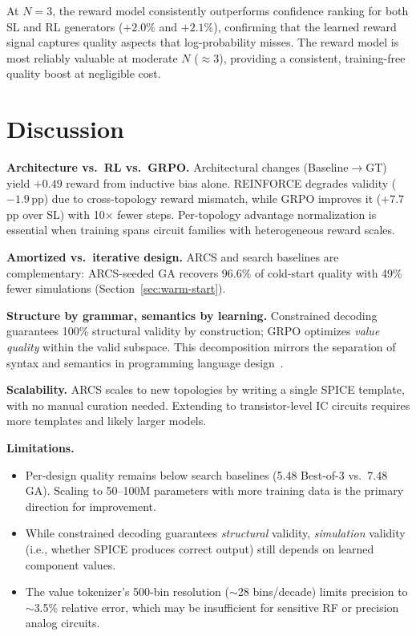 \documentclass[conference]{IEEEtran}
\begin{document}
At $N\!=\!3$, the reward model consistently outperforms confidence
ranking for both SL and RL generators ($+2.0\%$ and $+2.1\%$),
confirming that the learned reward signal captures quality aspects
that log-probability misses. The reward model is most reliably
valuable at moderate $N$ ($\approx$3), providing a consistent,
training-free quality boost at negligible cost.

\section{Discussion}
\label{sec:discussion}

\textbf{Architecture vs.\ RL vs.\ GRPO.} Architectural changes
(Baseline$\to$GT) yield $+0.49$ reward from inductive
bias alone. REINFORCE degrades validity ($-1.9$\,pp) due to
cross-topology reward mismatch, while GRPO improves it ($+7.7$\,pp
over SL) with 10$\times$ fewer steps. Per-topology advantage
normalization is essential when training spans circuit families with
heterogeneous reward scales.

\textbf{Amortized vs.\ iterative design.} ARCS and search baselines
are complementary: ARCS-seeded GA recovers 96.6\% of cold-start
quality with 49\% fewer simulations (Section~\ref{sec:warm-start}).

\textbf{Structure by grammar, semantics by learning.}
Constrained decoding guarantees 100\% structural validity by
construction; GRPO optimizes \emph{value quality} within the valid
subspace. This decomposition mirrors the separation of syntax and
semantics in programming language design~\cite{hokamp2017lexically}.

\textbf{Scalability.} ARCS scales to new topologies by writing a
single SPICE template, with no manual curation needed. Extending to
transistor-level IC circuits requires more templates and likely
larger models.

\textbf{Limitations.}
\begin{itemize}
    \item Per-design quality remains below search baselines (5.48
    Best-of-3 vs.\ 7.48 GA). Scaling to 50--100M parameters with more
    training data is the primary direction for improvement.
    \item While constrained decoding guarantees \emph{structural}
    validity, \emph{simulation} validity (i.e., whether SPICE produces
    correct output) still depends on learned component values.
    \item The value tokenizer's 500-bin resolution ($\sim$28 bins/decade)
    limits precision to $\sim$3.5\% relative error, which may be
    insufficient for sensitive RF or precision analog circuits.
\end{itemize}
\end{document}
